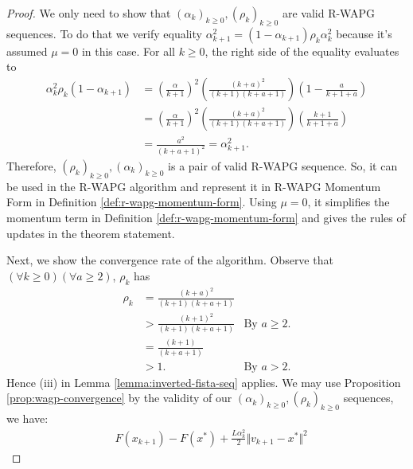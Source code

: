 \documentclass[12pt]{article}
\begin{document}
    \begin{proof}
        We only need to show that $(\alpha_k)_{k \ge 0}, (\rho_k)_{k \ge 0}$ are valid R-WAPG sequences. 
        To do that we verify equality $\alpha_{k + 1}^2 = (1 - \alpha_{k + 1})\rho_k \alpha_k^2$ because it's assumed $\mu = 0$ in this case. 
        For all $k \ge 0$, the right side of the equality evaluates to 
        \begin{align*}
            \alpha_k^2 \rho_k(1 - \alpha_{k + 1}) &= 
            \left(
                \frac{\alpha}{k + 1}
            \right)^2 \left(
                \frac{(k + a)^2}{(k + 1)(k + a + 1)}
            \right)
            \left(
                1 - \frac{a}{k + 1 + a}
            \right)
            \\
            &= \left(
                \frac{\alpha}{k + 1}
            \right)^2 \left(
                \frac{(k + a)^2}{(k + 1)(k + a + 1)}
            \right)
            \left(
                \frac{k + 1}{k + 1 + a}
            \right)
            \\
            &= \frac{a^2}{(k + a + 1)^2} = \alpha_{k + 1}^2. 
        \end{align*}
        Therefore, $(\rho_k)_{k \ge 0}, (\alpha_k)_{k \ge 0}$ is a pair of valid R-WAPG sequence. 
        So, it can be used in the R-WAPG algorithm and represent it in R-WAPG Momentum Form in Definition \ref{def:r-wapg-momentum-form}. 
        Using $\mu = 0$, it simplifies the momentum term in Definition \ref{def:r-wapg-momentum-form} and gives the rules of updates in the theorem statement. 
        \par
        Next, we show the convergence rate of the algorithm. 
        Observe that $(\forall k \ge 0)(\forall a \ge 2)$, $\rho_k$ has 
        \begin{align*}
            \rho_k &= \frac{(k + a)^2}{(k + 1)(k + a + 1)} 
            \\
            &> \frac{(k + 1)^2}{(k + 1)(k + a + 1)} 
            & \text{By } a \ge 2. 
            \\
            &= \frac{(k + 1)}{(k + a + 1)} 
            \\
            & > 1.   & \text{By } a > 2. 
        \end{align*}
        Hence (iii) in Lemma \ref{lemma:inverted-fista-seq} applies. 
        We may use Proposition \ref{prop:wagp-convergence} by the validity of our $(\alpha_k)_{k \ge0}, (\rho_k)_{k \ge 0}$ sequences, we have:
        \begin{align*}
            & F(x_{k + 1}) - F(x^*) + \frac{L\alpha_k^2}{2}\Vert v_{k + 1} - x^*\Vert^2

\end{align*}
\end{proof}
\end{document}
